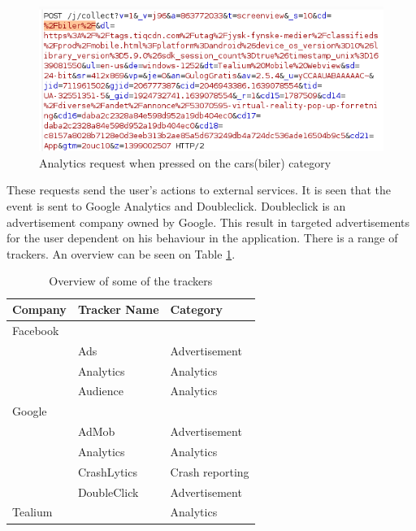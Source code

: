 \begin{figure}[htbp]
    \centering
    \includegraphics[width=1\columnwidth]{../dynamic-analysis/pictures/analytics-request-cars.png}
    \caption{Analytics request when pressed on the cars(biler) category}
    \label{fig:statistic-request-car}
\end{figure}

These requests send the user's actions to external services. It is seen that the event is sent to Google Analytics and Doubleclick. Doubleclick is an advertisement company owned by Google. This result in targeted advertisements for the user dependent on his behaviour in the application. There is a range of trackers. An overview can be seen on Table \ref{tab:trackers}. 

\begin{table}[]
    \centering
    \begin{tabular}{|l|l|l|}
    \hline
    \textbf{Company} & \textbf{Tracker Name} & \textbf{Category} \\ \hline
    Facebook         &                       &                   \\ \hline
                     & Ads                   & Advertisement     \\
                     & Analytics             & Analytics         \\
                     & Audience              & Analytics         \\ \hline
    Google           &                       &                   \\ \hline
                     & AdMob                 & Advertisement     \\
                     & Analytics             & Analytics         \\
                     & CrashLytics           & Crash reporting   \\
                     & DoubleClick           & Advertisement     \\ \hline
    Tealium          &                       & Analytics         \\ \hline
    \end{tabular}
    \caption{Overview of some of the trackers}
    \label{tab:trackers}
\end{table}

